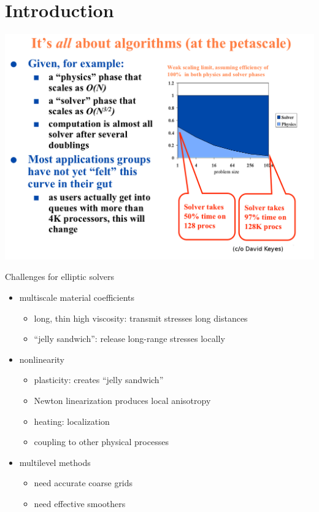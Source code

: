 \documentclass{beamer}
\begin{document}
\section{Introduction}
\begin{frame}
  \includegraphics[width=1.05\textwidth]{figures/KeyesAllAboutAlgorithms}
\end{frame}
\begin{frame}{Challenges for elliptic solvers}
  \begin{itemize}
  \item multiscale material coefficients
    \begin{itemize}
    \item long, thin high viscosity: transmit stresses long distances
    \item ``jelly sandwich'': release long-range stresses locally
    \end{itemize}
  \item nonlinearity
    \begin{itemize}
    \item plasticity: creates ``jelly sandwich''
    \item Newton linearization produces local anisotropy
    \item heating: localization
    \item coupling to other physical processes
    \end{itemize}
  \item multilevel methods
    \begin{itemize}
    \item need accurate coarse grids
    \item need effective smoothers
    \end{itemize}
  \end{itemize}
\end{frame}
\end{document}
